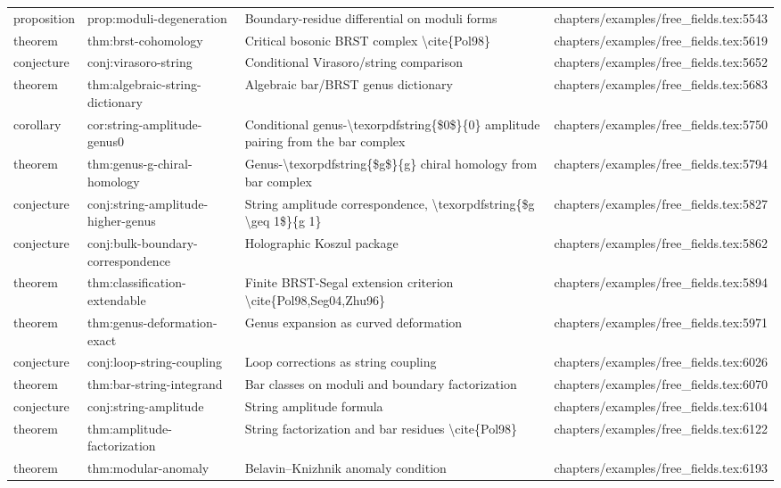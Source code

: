 \documentclass[11pt]{article}
\begin{document}
\begin{longtable}{L{0.10\textwidth}L{0.26\textwidth}L{0.42\textwidth}L{0.22\textwidth}}
proposition & prop:moduli-degeneration & Boundary-residue differential on moduli forms & chapters/examples/free\_fields.tex:5543\\
theorem & thm:brst-cohomology & Critical bosonic BRST complex \textbackslash{}cite\{Pol98\} & chapters/examples/free\_fields.tex:5619\\
conjecture & conj:virasoro-string & Cond{}itional Virasoro/string comparison & chapters/examples/free\_fields.tex:5652\\
theorem & thm:algebraic-string-dictionary & Algebraic bar/BRST genus dictionary & chapters/examples/free\_fields.tex:5683\\
corollary & cor:string-amplitude-genus0 & Cond{}itional genus-\textbackslash{}texorpdfstring\{\$0\$\}\{0\} amplitude pairing from the bar complex & chapters/examples/free\_fields.tex:5750\\
theorem & thm:genus-g-chiral-homology & Genus-\textbackslash{}texorpdfstring\{\$g\$\}\{g\} chiral homology from bar complex & chapters/examples/free\_fields.tex:5794\\
conjecture & conj:string-amplitude-higher-genus & String amplitude correspondence, \textbackslash{}texorpdfstring\{\$g \textbackslash{}geq 1\$\}\{g 1\} & chapters/examples/free\_fields.tex:5827\\
conjecture & conj:bulk-boundary-correspondence & Holographic Koszul package & chapters/examples/free\_fields.tex:5862\\
theorem & thm:classification-extendable & Finite BRST-Segal extension criterion \textbackslash{}cite\{Pol98,Seg04,Zhu96\} & chapters/examples/free\_fields.tex:5894\\
theorem & thm:genus-deformation-exact & Genus expansion as curved deformation & chapters/examples/free\_fields.tex:5971\\
conjecture & conj:loop-string-coupling & Loop corrections as string coupling & chapters/examples/free\_fields.tex:6026\\
theorem & thm:bar-string-integrand & Bar classes on moduli and boundary factorization & chapters/examples/free\_fields.tex:6070\\
conjecture & conj:string-amplitude & String amplitude formula & chapters/examples/free\_fields.tex:6104\\
theorem & thm:amplitude-factorization & String factorization and bar residues \textbackslash{}cite\{Pol98\} & chapters/examples/free\_fields.tex:6122\\
theorem & thm:modular-anomaly & Belavin--Knizhnik anomaly condition & chapters/examples/free\_fields.tex:6193\\

\end{longtable}
\end{document}
